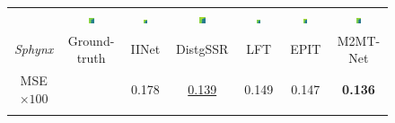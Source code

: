 \begin{figure}[ht!]
{\begin{tabular}{ccccccc}
    &
    \includegraphics[width=0.110\textwidth, height=0.110\textwidth,cfbox=red 1pt 0pt]{img/depth/crop/Sphynx/GT_2.png} &
    \includegraphics[width=0.110\textwidth, height=0.110\textwidth,cfbox=red 1pt 0pt]{img/depth/crop/Sphynx/IINet_2.png} &
    \includegraphics[width=0.110\textwidth, height=0.110\textwidth,cfbox=red 1pt 0pt]{img/depth/crop/Sphynx/DistgSSR_2.png} &
    \includegraphics[width=0.110\textwidth, height=0.110\textwidth,cfbox=red 1pt 0pt]{img/depth/crop/Sphynx/LFT_2.png} &
    \includegraphics[width=0.110\textwidth, height=0.110\textwidth,cfbox=red 1pt 0pt]{img/depth/crop/Sphynx/EPIT_2.png} &
    \includegraphics[width=0.110\textwidth, height=0.110\textwidth,cfbox=red 1pt 0pt]{img/depth/crop/Sphynx/SATNet_2.png} \\
    
    \textit{Sphynx} &
    Ground-truth &
    IINet \cite{liuLFIINet_TMM2021} &
    DistgSSR \cite{wangDistgSSR_TIP2022} &
    LFT \cite{liangLFT_SPL2022} &
    EPIT \cite{liangEPIT_arXiv2023} &
    M2MT-Net \\

    MSE$\times100$ &
    &
    0.178 &
    \underline{0.139} &
    0.149 &
    0.147 &
    \textbf{0.136} \\

    \vspace{-5pt} \\


\end{tabular}}
\end{figure}
